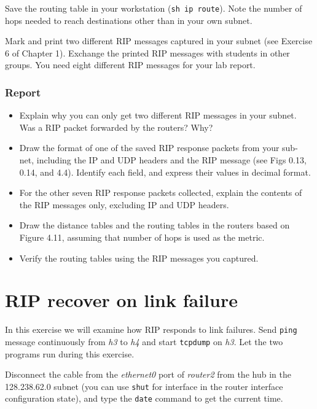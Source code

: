 \documentclass{../UTNetLab}
\begin{document}
    Save the routing table in your workstation (\lstinline{sh ip route}).
    Note the number of hops needed to reach destinations other than in your own subnet.

    Mark and print two different RIP messages captured in your subnet (see Exercise 6 of Chapter 1).
    Exchange the printed RIP messages with students in other groups.
    You need eight different RIP messages for your lab report.
    
    \subsubsection*{Report}
    \begin{itemize}
        \item Explain why you can only get two different RIP messages in your subnet.
        Was a RIP packet forwarded by the routers?
        Why?
        \item Draw the format of one of the saved RIP response packets from your sub- net, including the IP and UDP headers and the RIP message (see Figs 0.13, 0.14, and 4.4). Identify each field, and express their values in decimal format.
        \item For the other seven RIP response packets collected, explain the contents of the RIP messages only, excluding IP and UDP headers.
    \end{itemize}
    \begin{itemize}
        \item Draw the distance tables and the routing tables in the routers based on Figure 4.11, assuming that number of hops is used as the metric.
        \item Verify the routing tables using the RIP messages you captured.
    \end{itemize}


\section{RIP recover on link failure}
    In this exercise we will examine how RIP responds to link failures.
    Send \lstinline{ping} message continuously from \textit{h3} to \textit{h4} and start \lstinline{tcpdump} on \textit{h3}.
    Let the two programs run during this exercise.

    Disconnect the cable from the \textit{ethernet0} port of \textit{router2} from the hub in the 128.238.62.0 subnet (you can use \lstinline[language={cisco}]{shut} for interface in the router interface configuration state), and type the \lstinline{date} command to get the current time.
\end{document}
